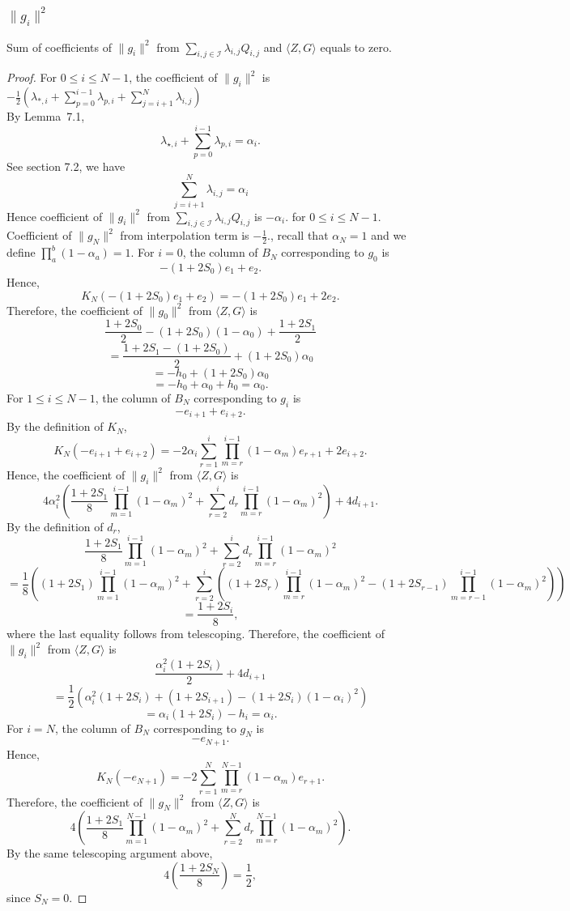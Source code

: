 {\subsubsection{$\|g_i\|^2$}
\begin{lemma}
    Sum of coefficients of $\|g_i\|^2$ from $\sum_{i,j \in \mathcal{I}}\lambda_{i,j} Q_{i,j}$ and $\langle Z,G \rangle$ equals to zero.
\end{lemma}
\begin{proof}
    For $0 \le i \le N-1$, the coefficient of $\|g_i\|^2$ is $- \frac{1}{2} (\lambda_{*,i} +\sum_{p=0}^{i-1} \lambda_{p,i} + \sum_{j=i+1}^N \lambda_{i,j})$\\
    By Lemma~7.1, \[\lambda_{\star,i}+\sum_{p=0}^{i-1}\lambda_{p,i}=\alpha_i.\]
    See section 7.2, we have \[\sum_{j=i+1}^{N} \lambda_{i,j} = \alpha_i\]
    Hence coefficient of $\|g_i\|^2$ from $\sum_{i,j \in \mathcal{I}}\lambda_{i,j} Q_{i,j}$
    is $-\alpha_i.$ for $0 \le i \le N-1.$\\
    Coefficient of $\|g_N\|^2$ from interpolation term is $-\frac{1}{2}.$, recall that $\alpha_N =1$ and we define $\prod_{a}^{b} (1-\alpha_a)=1.$
    For $i=0$, the column of $B_N$ corresponding to $g_0$ is
    \[-(1+2S_0)e_1+e_2.\]
    Hence,
    \[K_N(-(1+2S_0)e_1+e_2)=-(1+2S_0)e_1+2e_2.\]
    Therefore, the coefficient of $\|g_0\|^2$ from $\langle Z,G\rangle$ is
    \[\frac{1+2S_0}{2}-(1+2S_0)(1-\alpha_0)+\frac{1+2S_1}{2}\]
    \[=\frac{1+2S_1-(1+2S_0)}{2}+(1+2S_0)\alpha_0\]
    \[=-h_0+(1+2S_0)\alpha_0\]
    \[=-h_0+\alpha_0+h_0=\alpha_0.\]
    For $1\le i\le N-1$, the column of $B_N$ corresponding to $g_i$ is
    \[-e_{i+1}+e_{i+2}.\]
    By the definition of $K_N$,
    \[K_N(-e_{i+1}+e_{i+2})=-2\alpha_i\sum_{r=1}^{i}\prod_{m=r}^{i-1}(1-\alpha_m)e_{r+1}+ 2e_{i+2}.\]
    Hence, the coefficient of $\|g_i\|^2$ from $\langle Z,G\rangle$ is
    \[ 4\alpha_i^2 \left( \frac{1+2S_1}{8} \prod_{m=1}^{i-1}(1-\alpha_m)^2 + 
    \sum_{r=2}^{i} d_r \prod_{m=r}^{i-1}(1-\alpha_m)^2 \right) + 4d_{i+1}. \]
    By the definition of $d_r$, \[ \frac{1+2S_1}{8}\prod_{m=1}^{i-1}(1-\alpha_m)^2 +\sum_{r=2}^{i}d_r\prod_{m=r}^{i-1}(1-\alpha_m)^2 \]
\[ = \frac{1}{8} \left( (1+2S_1)\prod_{m=1}^{i-1}(1-\alpha_m)^2 + \sum_{r=2}^{i} 
\left( (1+2S_r)\prod_{m=r}^{i-1}(1-\alpha_m)^2 - (1+2S_{r-1})\prod_{m=r-1}^{i-1}(1-\alpha_m)^2 \right) \right) \]
\[ = \frac{1+2S_i}{8}, \]
where the last equality follows from telescoping.
Therefore, the coefficient of $\|g_i\|^2$ from $\langle Z,G\rangle$ is
\[\frac{\alpha_i^2(1+2S_i)}{2}+4d_{i+1}\]
\[=\frac{1}{2}
\left(
\alpha_i^2(1+2S_i)+(1+2S_{i+1})-(1+2S_i)(1-\alpha_i)^2
\right)\]
\[=\alpha_i(1+2S_i)-h_i=\alpha_i.\]
For $i=N$, the column of $B_N$ corresponding to $g_N$ is
\[-e_{N+1}.\]
Hence,
\[K_N(-e_{N+1})=-2\sum_{r=1}^{N}\prod_{m=r}^{N-1}(1-\alpha_m)e_{r+1}.\]
Therefore, the coefficient of $\|g_N\|^2$ from $\langle Z,G\rangle$ is
\[ 4\left(\frac{1+2S_1}{8}\prod_{m=1}^{N-1}(1-\alpha_m)^2+\sum_{r=2}^{N}d_r\prod_{m=r}^{N-1}(1-\alpha_m)^2\right).\]
By the same telescoping argument above,
\[4\left(\frac{1+2S_N}{8}\right)=\frac{1}{2},\] since $S_N=0$.
\end{proof}
}
